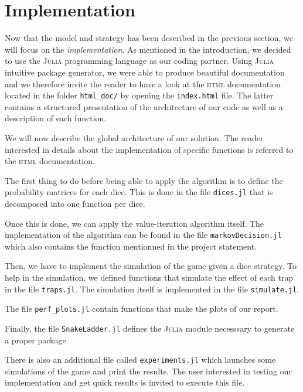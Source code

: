 \section{Implementation} %
\label{sec:implementation}
Now that the model and strategy has been described in the previous
section, we will focus on the \emph{implementation}.
As mentioned in the introduction, we decided to use the \textsc{Julia}
programming language as our coding partner.
Using \textsc{Julia} intuitive package generator, we were able to
produce beautiful documentation and we therefore invite
the reader to have a look at the \textsc{html} documentation located
in the folder \lstinline|html_doc/| by opening the \texttt{index.html} file.
The latter contains a structured presentation of the architecture
of our code as well as a description of each function.

We will now describe the global architecture of our solution. 
The reader interested in details about the implementation of
specific functions is referred to the \textsc{html} documentation. 

The first thing to do before being able to apply the algorithm
is to define the probability matrices for each dice. 
This is done in the file \texttt{dices.jl} that is decomposed into
one function per dice. 

Once this is done, we can apply the value-iteration algorithm itself. 
The implementation of the algorithm can be found in the file \texttt{markovDecision.jl}
which also contains the function mentionned in the project statement. 

Then, we have to implement the simulation of the game given a dice strategy.
To help in the simulation, we defined functions that simulate the effect
of each trap in the file \texttt{traps.jl}. The simulation itself is
implemented in the file \texttt{simulate.jl}. 

The file \texttt{perf\_plots.jl} contain functions that make the plots
of our report. 

Finally, the file \texttt{SnakeLadder.jl} defines the \textsc{Julia} module
necesssary to generate a proper package. 

There is also an additional file called \texttt{experiments.jl}
which launches some simulations of the game and print the results.
The user interested in testing our implementation and get quick results
is invited to execute this file.

